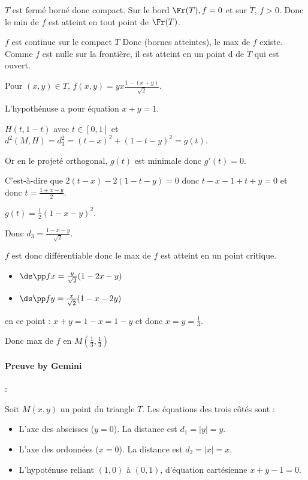 \begin{exemple}
    $T$ est fermé borné donc compact. Sur le bord $\Fr(T), f= 0$ et sur $\mathring T$, $f > 0$. 
    Donc le min de $f$ est atteint en tout point de $\Fr(T)$. 

    $f$ est continue sur le compact $T$ Donc (bornes atteintes), le max de $f$ 
    existe. Comme $f$ est nulle sur la frontière, il est atteint en un point 
    d de $\mathring T$ qui est ouvert. 

    Pour $(x, y) \in T$, $f(x, y) = y x \frac{1 - (x + y)}{\sqrt 2}$. 

    L'hypothénuse a pour équation $x + y = 1$.

    $H(t, 1 - t)$ avec $t \in [0, 1]$ et $d^2(M, H) = d_3^2 = (t - x)^2 + (1 - t - y)^2 = g(t)$.
    
    Or en le projeté orthogonal, $g(t)$ est minimale donc $g'(t) = 0$.

    C'est-à-dire que $2 (t - x) - 2(1 - t - y) = 0$ donc 
    $t - x - 1 + t+ y = 0$ et donc $t = \frac{1 + x - y}{2}$.

    $g(t) = \frac 1 2 (1 - x - y)^2$. 

    Donc $d_3 = \frac{ 1 - x - y}{\sqrt 2 }$. 

    $f$ est donc différentiable donc le max de $f$ est atteint en un point critique. 

    \begin{itemize}
        \item $\ds \pp f x = \frac{y}{\sqrt 2} (1 - 2x - y)$
        \item $\ds \pp f y = \frac{x}{\sqrt 2} (1 - x - 2y)$
    \end{itemize}

    en ce point : $x + y = 1 -x = 1 - y$ et donc $x = y = \frac 1 3$.

    Donc max de $f$ en $M\left( \frac 1 3, \frac 1 3 \right)$

    \lvspace \paragraph*{Preuve by Gemini} :


    \svspace Soit $M(x,y)$ un point du triangle $T$. Les équations des trois côtés sont :
    \begin{itemize}
        \item L'axe des abscisses ($y=0$). La distance est $d_1 = |y| = y$.
        \item L'axe des ordonnées ($x=0$). La distance est $d_2 = |x| = x$.
        \item L'hypoténuse reliant $(1,0)$ à $(0,1)$, d'équation cartésienne $x+y-1=0$.
    \end{itemize}


\end{exemple}

